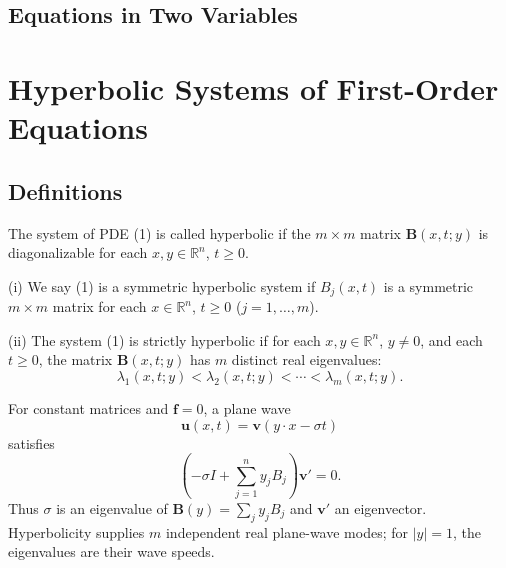 \subsection{Equations in Two Variables}

\section{Hyperbolic Systems of First-Order Equations}
\label{sec:hyperbolic-systems-first-order-equations}

\subsection{Definitions}

\begin{definition}
\label{def:hyperbolic-system}
The system of PDE (1) is called hyperbolic if the $m \times m$ matrix $\mathbf{B}(x, t; y)$ is diagonalizable for each $x, y \in \mathbb{R}^n$, $t \geq 0$.
\end{definition}

\begin{definition}
\label{def:symmetric-strictly-hyperbolic-system}

(i) We say (1) is a symmetric hyperbolic system if $B_j(x, t)$ is a symmetric $m \times m$ matrix for each $x \in \mathbb{R}^n$, $t \geq 0$ ($j = 1, \ldots, m$).

(ii) The system (1) is strictly hyperbolic if for each $x, y \in \mathbb{R}^n$, $y \neq 0$, and each $t \geq 0$, the matrix $\mathbf{B}(x, t; y)$ has $m$ distinct real eigenvalues:
\[
\lambda_1(x, t; y) < \lambda_2(x, t; y) < \cdots < \lambda_m(x, t; y).
\]
\end{definition}

\begin{remark}
\label{rem:motivation-hyperbolicity-plane-wave}

For constant matrices and $\mathbf f=0$, a plane wave
\[
\mathbf u(x,t)=\mathbf v(y\cdot x-\sigma t)
\tag{4}
\]
satisfies
\[
\left(-\sigma I+\sum_{j=1}^ny_jB_j\right)\mathbf v'=0.
\]
Thus $\sigma$ is an eigenvalue of $\mathbf B(y)=\sum_jy_jB_j$ and $\mathbf v'$ an eigenvector. Hyperbolicity supplies $m$ independent real plane-wave modes; for $|y|=1$, the eigenvalues are their wave speeds.
\end{remark}

